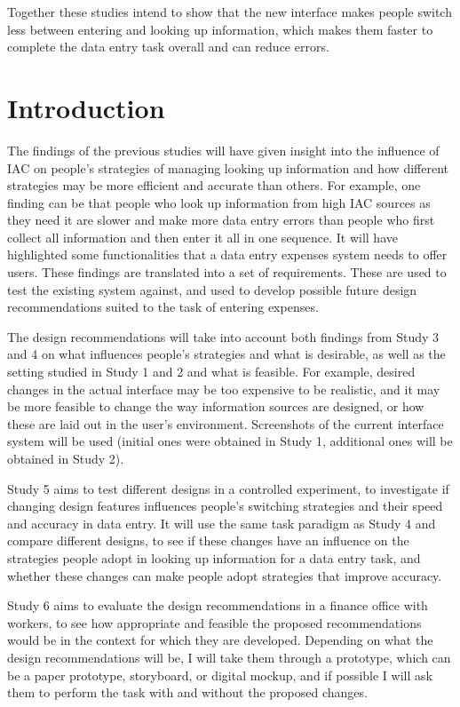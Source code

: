 \documentclass[11pt,oneside]{report}
\begin{document}
\begin{table}
\begin{mynote}
Together these studies intend to show that the new interface makes people switch less between entering and looking up information, which makes them faster to complete the data entry task overall and can reduce errors.
\end{mynote}

\section{Introduction}

The findings of the previous studies will have given insight into the influence of IAC on people's strategies of managing looking up information and how different strategies may be more efficient and accurate than others. For example, one finding can be that people who look up information from high IAC sources as they need it are slower and make more data entry errors than people who first collect all information and then enter it all in one sequence. 
It will have highlighted some functionalities that a data entry expenses system needs to offer users. These findings are translated into a set of requirements. These are used to test the existing system against, and used to develop possible future design recommendations suited to the task of entering expenses. 

The design recommendations will take into account both findings from Study 3 and 4 on what influences people's strategies and what is desirable, as well as the setting studied in Study 1 and 2 and what is feasible. For example, desired changes in the actual interface may be too expensive to be realistic, and it may be more feasible to change the way information sources are designed, or how these are laid out in the user's environment. Screenshots of the current interface system will be used (initial ones were obtained in Study 1, additional ones will be obtained in Study 2). 

Study 5 aims to test different designs in a controlled experiment, to investigate if changing design features influences people's switching strategies and their speed and accuracy in data entry. It will use the same task paradigm as Study 4 and compare different designs, to see if these changes have an influence on the strategies people adopt in looking up information for a data entry task, and whether these changes can make people adopt strategies that improve accuracy. 

Study 6 aims to evaluate the design recommendations in a finance office with workers, to see how appropriate and feasible the proposed recommendations would be in the context for which they are developed. Depending on what the design recommendations will be, I will take them through a prototype, which can be a paper prototype, storyboard, or digital mockup, and if possible I will ask them to perform the task with and without the proposed changes. 


\end{table}
\end{document}
